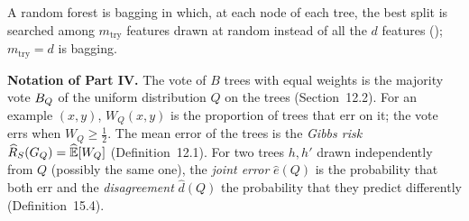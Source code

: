\documentclass[a4paper,11pt]{article}
\begin{document}
\label{p2:rf}

A random forest is bagging in which, at each node of each tree, the best split is searched among $m_{\text{try}}$
features drawn at random instead of all the $d$ features ();
$m_{\text{try}}=d$ is bagging.

\noindent\textbf{Notation of Part IV.} The vote of $B$ trees with equal weights is the majority vote $B_{Q}$ of the uniform
distribution $Q$ on the trees (Section~12.2). For an example $(x,y)$, $W_Q(x,y)$ is the proportion of trees that err on
it; the vote errs when $W_Q\geq\frac12$. The mean error of the trees is the \emph{Gibbs risk}
$\widehat{R}_{S}(G_{Q})=\widehat{\mathbb{E}}[W_Q]$ (Definition~12.1). For two trees $h,h'$ drawn independently from $Q$ (possibly the same
one), the \emph{joint error} $\hat e(Q)$ is the probability that both err and the \emph{disagreement} $\hat d(Q)$ the
probability that they predict differently (Definition~15.4).
\end{document}

